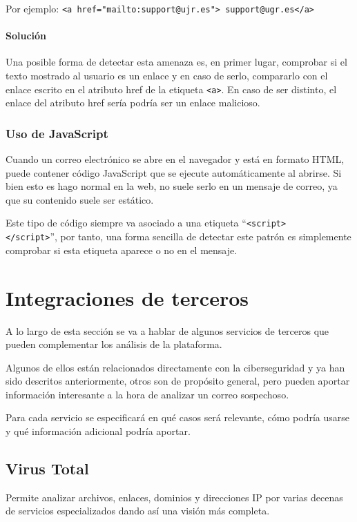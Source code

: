 Por ejemplo: \verb|<a href="mailto:support@ujr.es"> support@ugr.es</a>|

\paragraph{Solución}
Una posible forma de detectar esta amenaza es, en primer lugar, comprobar si el texto mostrado al usuario es un enlace y en caso de serlo, compararlo con el enlace escrito en el atributo href de la etiqueta \verb!<a>!. En caso de ser distinto, el enlace del atributo href sería podría ser un enlace malicioso. 

\subsubsection{Uso de JavaScript}
Cuando un correo electrónico se abre en el navegador y está en formato HTML, puede contener código JavaScript que se ejecute automáticamente al abrirse. Si bien esto es hago normal en la web, no suele serlo en un mensaje de correo, ya que su contenido suele ser estático. 

Este tipo de código siempre va asociado a una etiqueta ``\verb|<script>|\\\verb|</script>|'', por tanto, una forma sencilla de detectar este patrón es simplemente comprobar si esta etiqueta aparece o no en el mensaje. 

\section{Integraciones de terceros}
A lo largo de esta sección se va a hablar de algunos servicios de terceros que pueden complementar los análisis de la plataforma. 

Algunos de ellos están relacionados directamente con la ciberseguridad y ya han sido descritos anteriormente, otros son de propósito general, pero pueden aportar información interesante a la hora de analizar un correo sospechoso. 

Para cada servicio se especificará en qué casos será relevante, cómo podría usarse y qué información adicional podría aportar.

\subsection{Virus Total}
Permite analizar archivos, enlaces, dominios y direcciones IP por varias decenas de servicios especializados dando así una visión más completa. 

